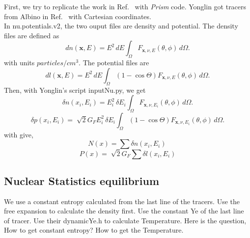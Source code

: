 \documentclass[
reprint,
preprintnumbers,
 amsmath,
 amssymb,
 aps,
onecolumn,
prd,
]{revtex4-2}
\begin{document}
First, we try to replicate the work in Ref.~\citet{Martin2016Impact} with {\it Prism} code.
Yonglin got tracers from Albino in Ref.~\citet{Martin2016Impact} with Cartesian coordinates. 
\\
In nu.potentials.v2, the two ouput files are density and potential. The density files are defined as
\begin{equation}
dn(\mathbf{x},E	) = E^2\,dE \int_\Omega F_{\mathbf{x}, \nu, E}(\theta, \phi)\,d\Omega.
\end{equation}
with units $particles/cm^3$. The potential files are 
\begin{equation}
dl(\mathbf{x},E	) = E^2\,dE \int_\Omega \left(1-\cos \Theta \right)F_{\mathbf{x}, \nu, E}(\theta, \phi)\,d\Omega.
\end{equation}
Then, with Yonglin's script inputNu.py, we get
\begin{equation}
\delta n(x_i,E_i)=E_i^2\,\delta E_i \int_\Omega F_{\mathbf{x}, \nu, E_i}(\theta, \phi)\,d\Omega.
\end{equation}
\begin{equation}
\delta p(x_i,E_i)=\sqrt[]{2} G_F E_i^2\,\delta E_i \int_\Omega \left(1-\cos \Theta \right)F_{\mathbf{x}, \nu, E_i}(\theta, \phi)\,d\Omega.
\end{equation}
with give,
\begin{equation}
N(x)=\sum \delta n(x_i,E_i)\,
\end{equation}
\begin{equation}
P(x)=\sqrt[]{2} G_F \sum \delta l(x_i,E_i)
\end{equation}

\subsection{Nuclear Statistics equilibrium}
We use a constant entropy calculated from the last line of the tracers. Use the free expansion to calculate the density first. Use the constant Ye of the last line of tracer. Use their dynamicYe.h to calculate Temperature.
Here is the question,
How to get constant entropy? How to get the Temperature.
\end{document}
